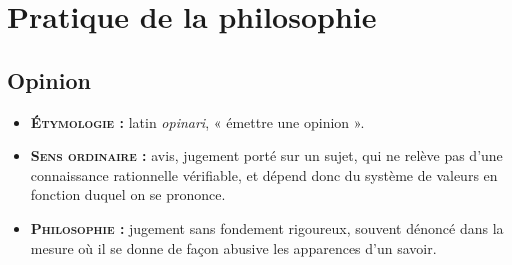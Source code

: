 \section{Pratique de la philosophie}

\subsection{Opinion}

{\footnotesize
\begin{itemize}[leftmargin=1cm, label=, itemsep=1pt]
\item {\bf \textsc{Étymologie} :} latin {\it opinari},
« émettre une opinion ».
\item {\bf \textsc{Sens ordinaire} :} avis,
jugement porté sur
un sujet, qui ne relève pas d'une
connaissance rationnelle vérifiable,
et dépend donc du système de
valeurs en fonction duquel on se
prononce.
\item {\bf \textsc{Philosophie} :} jugement
sans fondement rigoureux,
souvent dénoncé dans la mesure où
il se donne de façon abusive les
apparences d’un savoir.
\end{itemize}
}

